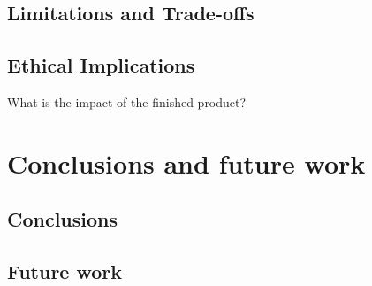         \subsection{Limitations and Trade-offs}
    
        \subsection{Ethical Implications}
            \begin{temp}
                What is the impact of the finished product?
            \end{temp}
    
    \section{Conclusions and future work} %
        \subsection{Conclusions}
        
        \subsection{Future work}
    
    \printbibliography[title={References},heading=bibintoc] %
    
    
    
